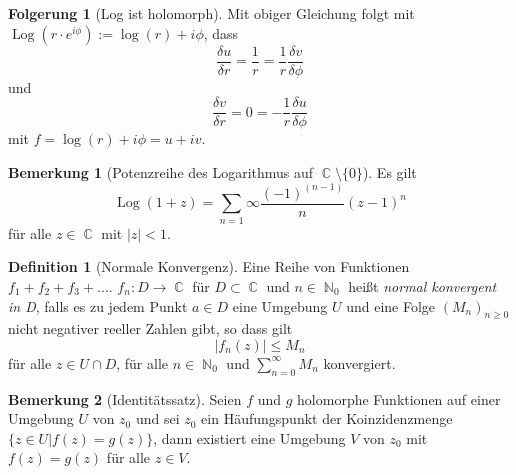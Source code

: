 \documentclass[10pt,a4paper]{article}
\theoremstyle{plain}
\theoremstyle{definition}
\newtheorem{defn}{Definition}[section]
\newtheorem*{note}{Bemerkung}
\newtheorem*{folg}{Folgerung}
\theoremstyle{remark}
\DeclareMathOperator{\C}{\mathbb{C}}
\DeclareMathOperator{\N}{\mathbb{N}}
\DeclareMathOperator{\Log}{Log}
\begin{document}
\begin{folg}[Log ist holomorph]

Mit obiger Gleichung folgt mit $\Log(r\cdot e^{i \phi}) := \log(r) + i \phi$, dass $$\frac{\delta u}{\delta r} =\frac{1}{r} = \frac{1}{r} \frac{\delta v}{\delta \phi} $$ und $$\frac{\delta v}{\delta r} = 0=-\frac{1}{r} \frac{\delta u}{\delta \phi}$$ mit $f = \log(r) + i\phi= u +iv$.

\end{folg}

\begin{note}[Potenzreihe des Logarithmus auf $\C\setminus\{0\}$]

Es gilt $$\Log(1+z) = \sum_{n = 1}{\infty}\frac{(-1)^{(n-1)}}{n}(z-1)^{n}$$ für alle $z \in \C$ mit $|z| < 1$.

\end{note}

\begin{defn}[Normale Konvergenz]

Eine Reihe von Funktionen\\ $f_{1}+f_{2}+f_{3}+....$ $f_{n}: D\rightarrow \C $ für $D \subset \C$ und $n \in \N_{0}$ heißt \textit{normal konvergent in D}, falls es zu jedem Punkt $a \in D$ eine Umgebung $U$ und eine Folge $(M_{n})_{n\geq0}$ nicht negativer reeller Zahlen gibt, so dass gilt $$|f_{n}(z)|\leq M_{n}$$ für alle $z \in U \cap D$, für alle $n \in \N_{0}$ und $\sum_{n = 0}^{\infty}M_{n}$ konvergiert.

\end{defn}

\begin{note}[Identitätssatz]

Seien $f$ und $g$ holomorphe Funktionen auf einer Umgebung $U$ von $z_{0}$ und sei $z_{0}$ ein Häufungspunkt der Koinzidenzmenge\\  $\{ z \in U  |  f(z) = g(z) \}$, dann existiert eine Umgebung $V$ von $z_{0}$ mit $f(z) = g(z)$ für alle $z \in V$.

\end{note}
\end{document}
